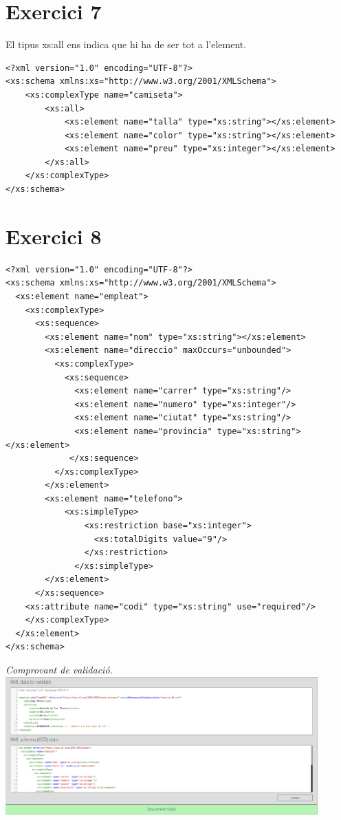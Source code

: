 \documentclass{article}
\begin{document}
\section{Exercici 7}
El tipus xs:all ens indica que hi ha de ser tot a l'element.
\begin{verbatim}
<?xml version="1.0" encoding="UTF-8"?>
<xs:schema xmlns:xs="http://www.w3.org/2001/XMLSchema">
    <xs:complexType name="camiseta">
        <xs:all>
            <xs:element name="talla" type="xs:string"></xs:element>
            <xs:element name="color" type="xs:string"></xs:element>
            <xs:element name="preu" type="xs:integer"></xs:element>          
        </xs:all>
    </xs:complexType>
</xs:schema>
\end{verbatim}
\vspace{0cm}
\newpage
\section{Exercici 8}

\begin{verbatim}
<?xml version="1.0" encoding="UTF-8"?>
<xs:schema xmlns:xs="http://www.w3.org/2001/XMLSchema">
  <xs:element name="empleat">
    <xs:complexType>
      <xs:sequence>
        <xs:element name="nom" type="xs:string"></xs:element>
        <xs:element name="direccio" maxOccurs="unbounded">
          <xs:complexType>
            <xs:sequence>
              <xs:element name="carrer" type="xs:string"/>
              <xs:element name="numero" type="xs:integer"/>
              <xs:element name="ciutat" type="xs:string"/>
              <xs:element name="provincia" type="xs:string"></xs:element>
             </xs:sequence>
          </xs:complexType>
        </xs:element>
        <xs:element name="telefono">
            <xs:simpleType>
                <xs:restriction base="xs:integer">
                  <xs:totalDigits value="9"/>
                </xs:restriction>
              </xs:simpleType>
        </xs:element>
      </xs:sequence>
    <xs:attribute name="codi" type="xs:string" use="required"/>
    </xs:complexType>
  </xs:element>
</xs:schema>
\end{verbatim}
\vspace{0cm}
\begin{center}
    \textit{Comprovant de validació.}
    \includegraphics[width=12cm]{validacio8.png}
\end{center}
\end{document}
